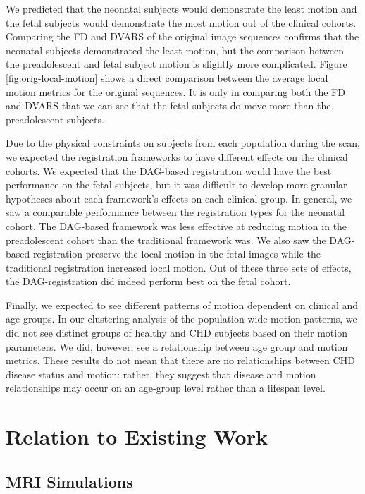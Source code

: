 We predicted that the neonatal subjects would demonstrate the least motion and the fetal subjects would demonstrate the most motion out of the clinical cohorts. Comparing the FD and DVARS of the original image sequences confirms that the neonatal subjects demonstrated the least motion, but the comparison between the preadolescent and fetal subject motion is slightly more complicated. Figure \ref{fig:orig-local-motion} shows a direct comparison between the average local motion metrics for the original sequences. It is only in comparing both the FD and DVARS that we can see that the fetal subjects do move more than the preadolescent subjects.

Due to the physical constraints on subjects from each population during the scan, we expected the registration frameworks to have different effects on the clinical cohorts. We expected that the DAG-based registration would have the best performance on the fetal subjects, but it was difficult to develop more granular hypotheses about each framework's effects on each clinical group. In general, we saw a comparable performance between the registration types for the neonatal cohort. The DAG-based framework was less effective at reducing motion in the preadolescent cohort than the traditional framework was. We also saw the DAG-based registration preserve the local motion in the fetal images while the traditional registration increased local motion.  Out of these three sets of effects, the DAG-registration did indeed perform best on the fetal cohort. 

Finally, we expected to see different patterns of motion dependent on clinical and age groups. In our clustering analysis of the population-wide motion patterns, we did not see distinct groups of healthy and CHD subjects based on their motion parameters. We did, however, see a relationship between age group and motion metrics. These results do not mean that there are no relationships between CHD disease status and motion: rather, they suggest that disease and motion relationships may occur on an age-group level rather than a lifespan level.

\section{Relation to Existing Work}

\subsection{MRI Simulations} 

